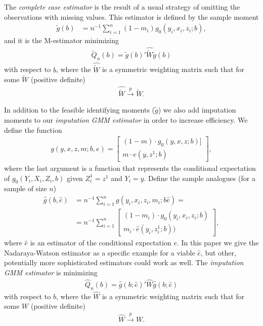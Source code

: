 \documentclass{article}
\theoremstyle{definition}
\theoremstyle{remark}
\begin{document}
The \textit{complete case estimator} is the result of a usual strategy of omitting the observations with missing values. This estimator is defined by the sample moment
\begin{align}
\tilde{g}(b)&= n^{-1}\sum_{i=1}^n
(1-m_i) g_0(y_i,x_i, z_i; b),
\end{align}
and it is the M-estimator minimizing
\begin{align}
\tilde{Q}_n(b)= \tilde{g}(b)'\hat{\tilde{W}}\tilde{g}(b)
\end{align}
with respect to $b$, where the $\hat{\tilde{W}}$ is a symmetric weighting matrix such that for some $\tilde{W}$ (positive definite)
\begin{align}
\hat{\tilde{W}} \stackrel{p}{\rightarrow}\tilde{W}.
\end{align}

In addition to the feasible identifying moments ($\tilde{g}$) we also add imputation moments to our \emph{imputation GMM estimator} in order to increase efficiency. We define the function
\begin{align}
g(y,x,z,m;b,e)= \left[\begin{array}{c}
(1-m) \cdot g_0(y,x,z;b)]\\
m \cdot e(y, z^1; b)
\end{array}\right],
\end{align}
where the last argument is a function that represents the conditional expectation of $g_0(Y_i, X_i, Z_i, b)$ given $Z^1_i=z^1$ and $Y_i=y$. Define the sample analogues (for a sample of size $n$)
\begin{align}
\hat{g}(b, \hat{e})&=n^{-1}\sum_{i=1}^n g(y_i,x_i,z_i,m_i; b \hat{e})= \\
&=n^{-1}\sum_{i=1}^n\left[\begin{array}{c}
(1-m_i) \cdot g_0(y_i,x_i,z_i; b)  \\
m_i \cdot \hat{e}(y_i, z_i^1; b))
\end{array}\right], \nonumber
\end{align}
where $\hat{e}$ is an estimator of the conditional expectation $e$. In this paper we give the Nadaraya-Watson estimator as a specific example for a viable $\hat{e}$, but other, potentially more sophisticated estimators could work as well. The \textit{imputation GMM estimator} is minimizing
\begin{align}
\hat{Q}_n(b)= \hat{g}(b;\hat{e})'\hat{W}\hat{g}(b;\hat{e})
\end{align}
with respect to $b$, where the $\hat{W}$ is a symmetric weighting matrix such that for some $W$ (positive definite)
\begin{align}
\hat{W} \stackrel{p}{\rightarrow}W.
\end{align}
\end{document}
